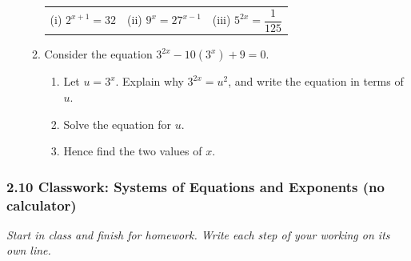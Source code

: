 \documentclass[12pt, twoside]{article}
\begin{document}
\begin{enumerate}[itemsep=0.15cm]
\begin{enumerate}[itemsep=0.15cm]
  \begin{tabular}{@{}p{}p{}p{}}
  (i) $2^{x + 1} = 32$ & (ii) $9^{x} = 27^{x - 1}$ &
  (iii) $5^{2x} = \dfrac{1}{125}$
  \end{tabular}
  \vfill
  \item Consider the equation $3^{2x} - 10\left(3^{x}\right) + 9 = 0$.
  \begin{enumerate}[label=(\roman*), itemsep=0.1cm]
    \item Let $u = 3^{x}$. Explain why $3^{2x} = u^{2}$, and write the
    equation in terms of $u$. \vfill
    \item Solve the equation for $u$. \vfill
    \item Hence find the two values of $x$. \vfill
  \end{enumerate}
\end{enumerate}

\end{enumerate}

\newpage
\subsubsection*{2.10 Classwork: Systems of Equations and Exponents (no calculator)}

\emph{Start in class and finish for homework. Write each step of your
working on its own line.}
\end{document}
